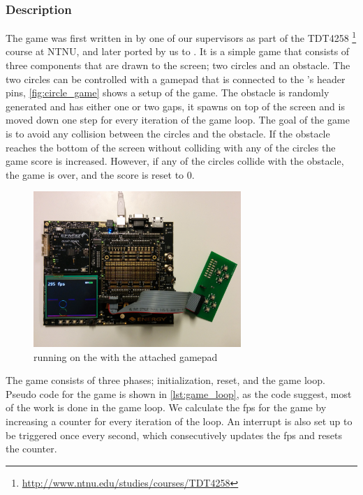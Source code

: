 \subsubsection{Description}

The game was first written in {\C} by one of our supervisors as part of the TDT4258 \footnote{\url{http://www.ntnu.edu/studies/courses/TDT4258}} course at NTNU, and later ported by us to {\rust}.
It is a simple game that consists of three components that are drawn to the screen; two circles and an obstacle.
The two circles can be controlled with a gamepad that is connected to the {\DK}'s header pins, \autoref{fig:circle_game} shows a setup of the game.
The obstacle is randomly generated and has either one or two gaps, it spawns on top of the screen and is moved down one step for every iteration of the game loop.
The goal of the game is to avoid any collision between the circles and the obstacle.
If the obstacle reaches the bottom of the screen without colliding with any of the circles the game score is increased.
However, if any of the circles collide with the obstacle, the game is over, and the score is reset to 0.

\begin{figure}[H]
  \centering
  \includegraphics[width=0.7\textwidth]{figures/circle-game.jpg}
  \caption{{\cg} running on the {\DK} with the attached gamepad}
  \label{fig:circle_game}
\end{figure}

The game consists of three phases; initialization, reset, and the game loop.
Pseudo code for the game is shown in \autoref{lst:game_loop}, as the code suggest, most of the work is done in the game loop.
We calculate the \gls{fps} for the game by increasing a counter for every iteration of the loop.
An interrupt is also set up to be triggered once every second, which consecutively updates the \gls{fps} and resets the counter.

